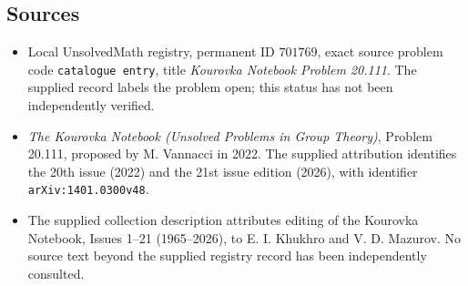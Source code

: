 \documentclass[11pt]{article}
\begin{document}
\subsection{Sources}
\begin{itemize}
\item Local UnsolvedMath registry, permanent ID \(701769\), exact source problem code \texttt{catalogue entry}, title \emph{Kourovka Notebook Problem 20.111}. The supplied record labels the problem open; this status has not been independently verified.
\item \emph{The Kourovka Notebook (Unsolved Problems in Group Theory)}, Problem 20.111, proposed by M. Vannacci in 2022. The supplied attribution identifies the 20th issue (2022) and the 21st issue edition (2026), with identifier \texttt{arXiv:1401.0300v48}.
\item The supplied collection description attributes editing of the Kourovka Notebook, Issues 1--21 (1965--2026), to E. I. Khukhro and V. D. Mazurov. No source text beyond the supplied registry record has been independently consulted.
\end{itemize}
\end{document}
